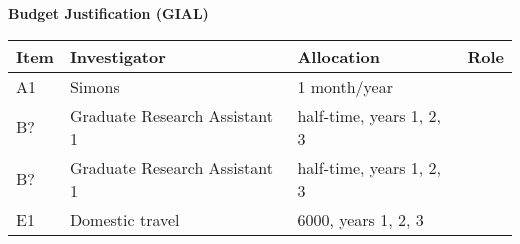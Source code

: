 \documentclass[11pt]{nsf}
\begin{document}
\begin{center}\textbf{\Large
Budget Justification (GIAL)
}\end{center}


\vspace{1ex}

{\small\noindent
\begin{tabular}{lllp{3in}}
\textbf{Item} &
\textbf{Investigator} & \textbf{Allocation} & \textbf{Role} \\ \hline

A1 & Simons & 1 month/year &
\\

B? & Graduate Research Assistant 1 & half-time, years 1, 2, 3 &
\\

B? & Graduate Research Assistant 1 & half-time, years 1, 2, 3 &
\\

E1 & Domestic travel & 6000, years 1, 2, 3 &
\\

\end{tabular}}
\end{document}
